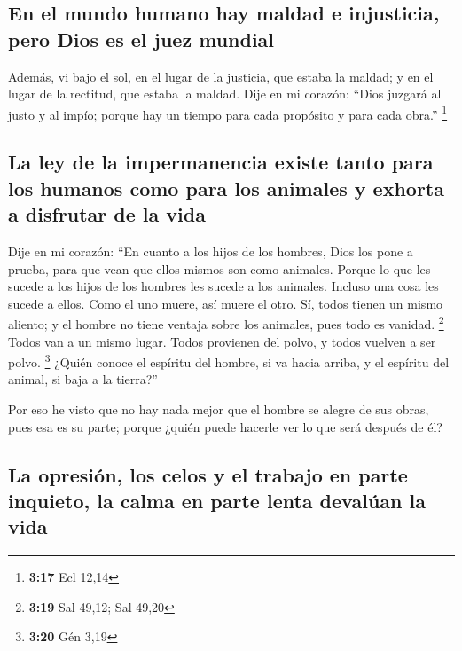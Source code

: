 \hypertarget{en-el-mundo-humano-hay-maldad-e-injusticia-pero-dios-es-el-juez-mundial}{%
\subsection{En el mundo humano hay maldad e injusticia, pero Dios es el
juez
mundial}\label{en-el-mundo-humano-hay-maldad-e-injusticia-pero-dios-es-el-juez-mundial}}

 Además, vi bajo el sol, en el lugar de la justicia, que
estaba la maldad; y en el lugar de la rectitud, que estaba la maldad.
 Dije en mi corazón: ``Dios juzgará al justo y al impío;
porque hay un tiempo para cada propósito y para cada obra.'' \footnote{\textbf{3:17}
  Ecl 12,14}

\hypertarget{la-ley-de-la-impermanencia-existe-tanto-para-los-humanos-como-para-los-animales-y-exhorta-a-disfrutar-de-la-vida}{%
\subsection{La ley de la impermanencia existe tanto para los humanos
como para los animales y exhorta a disfrutar de la
vida}\label{la-ley-de-la-impermanencia-existe-tanto-para-los-humanos-como-para-los-animales-y-exhorta-a-disfrutar-de-la-vida}}

 Dije en mi corazón: ``En cuanto a los hijos de los
hombres, Dios los pone a prueba, para que vean que ellos mismos son como
animales.  Porque lo que les sucede a los hijos de los
hombres les sucede a los animales. Incluso una cosa les sucede a ellos.
Como el uno muere, así muere el otro. Sí, todos tienen un mismo aliento;
y el hombre no tiene ventaja sobre los animales, pues todo es vanidad.
\footnote{\textbf{3:19} Sal 49,12; Sal 49,20}  Todos van
a un mismo lugar. Todos provienen del polvo, y todos vuelven a ser
polvo. \footnote{\textbf{3:20} Gén 3,19}  ¿Quién conoce
el espíritu del hombre, si va hacia arriba, y el espíritu del animal, si
baja a la tierra?''

 Por eso he visto que no hay nada mejor que el hombre se
alegre de sus obras, pues esa es su parte; porque ¿quién puede hacerle
ver lo que será después de él?

\hypertarget{la-opresiuxf3n-los-celos-y-el-trabajo-en-parte-inquieto-la-calma-en-parte-lenta-devaluxfaan-la-vida}{%
\subsection{La opresión, los celos y el trabajo en parte inquieto, la
calma en parte lenta devalúan la
vida}\label{la-opresiuxf3n-los-celos-y-el-trabajo-en-parte-inquieto-la-calma-en-parte-lenta-devaluxfaan-la-vida}}

